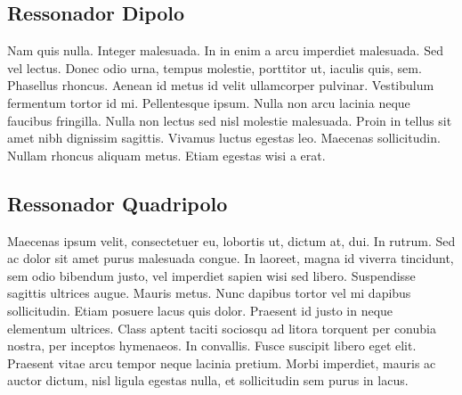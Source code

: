 \subsection{Ressonador Dipolo}

Nam quis nulla. Integer malesuada. In in enim a arcu imperdiet malesuada. Sed vel lectus. Donec odio urna, tempus molestie, porttitor ut, iaculis quis, sem. Phasellus rhoncus. Aenean id metus id velit ullamcorper pulvinar. Vestibulum fermentum tortor id mi. Pellentesque ipsum. Nulla non arcu lacinia neque faucibus fringilla. Nulla non lectus sed nisl molestie malesuada. Proin in tellus sit amet nibh dignissim sagittis. Vivamus luctus egestas leo. Maecenas sollicitudin. Nullam rhoncus aliquam metus. Etiam egestas wisi a erat.


\subsection{Ressonador Quadripolo}

Maecenas ipsum velit, consectetuer eu, lobortis ut, dictum at, dui. In rutrum. Sed ac dolor sit amet purus malesuada congue. In laoreet, magna id viverra tincidunt, sem odio bibendum justo, vel imperdiet sapien wisi sed libero. Suspendisse sagittis ultrices augue. Mauris metus. Nunc dapibus tortor vel mi dapibus sollicitudin. Etiam posuere lacus quis dolor. Praesent id justo in neque elementum ultrices. Class aptent taciti sociosqu ad litora torquent per conubia nostra, per inceptos hymenaeos. In convallis. Fusce suscipit libero eget elit. Praesent vitae arcu tempor neque lacinia pretium. Morbi imperdiet, mauris ac auctor dictum, nisl ligula egestas nulla, et sollicitudin sem purus in lacus.
